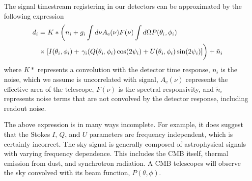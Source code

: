 The signal timestream registering in our detectors can be approximated by the following expression
\begin{equation}
\begin{split}
d _i &= K \ast \left( n_i + g_i \int d \nu A_\mathrm{e} (\nu) F(\nu) \int d\Omega P (\theta _i,\phi _i) \right. \\ 
&\times [I(\theta _i, \phi _i) + \left. \gamma _i (Q(\theta _i,\phi _i)\cos (2\psi _i) + U(\theta _i,\phi _i) \sin (2\psi _i) ]  \vphantom{\int } \right) + \tilde{n}_i
\end{split}
\end{equation}
where $K \ast$ represents a convolution with the detector time response, $n_i$ is the noise, which we assume is uncorrelated with signal, $A_{\mathrm{e}} (\nu)$ represents the effective area of the telescope, $F(\nu)$ is the spectral responsivity, and $\tilde{n}_i$ represents noise terms that are not convolved by the detector response, including readout noise. 

The above expression is in many ways incomplete. For example, it does suggest that the Stokes $I$, $Q$, and $U$ parameters are frequency independent, which is certainly incorrect. The sky signal is generally composed of astrophysical signals with varying frequency dependence. This includes the CMB itself, thermal emission from dust, and synchrotron radiation. A CMB telescopes will observe the sky convolved with its beam function, $P(\theta, \phi)$.